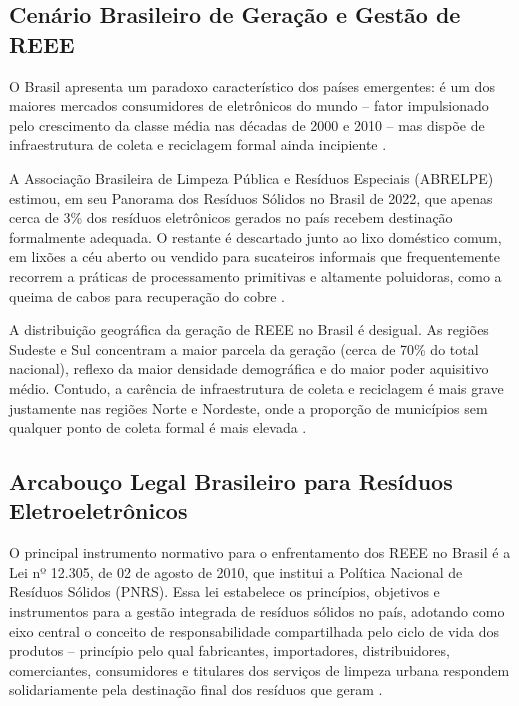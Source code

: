 \documentclass[12pt, a4paper]{article}
\numberwithin{equation}{section}
\numberwithin{figure}{section}
\numberwithin{table}{section}
\begin{document}
\subsection{Cenário Brasileiro de Geração e Gestão de REEE}

O Brasil apresenta um paradoxo característico dos países emergentes: é um dos
maiores mercados consumidores de eletrônicos do mundo -- fator impulsionado pelo
crescimento da classe média nas décadas de 2000 e 2010 -- mas dispõe de
infraestrutura de coleta e reciclagem formal ainda incipiente \cite{abrelpe2023}.

A Associação Brasileira de Limpeza Pública e Resíduos Especiais (ABRELPE)
estimou, em seu Panorama dos Resíduos Sólidos no Brasil de 2022, que apenas
cerca de 3\% dos resíduos eletrônicos gerados no país recebem destinação
formalmente adequada. O restante é descartado junto ao lixo doméstico comum,
em lixões a céu aberto ou vendido para sucateiros informais que frequentemente
recorrem a práticas de processamento primitivas e altamente poluidoras, como
a queima de cabos para recuperação do cobre \cite{abrelpe2023}.

A distribuição geográfica da geração de REEE no Brasil é desigual. As regiões
Sudeste e Sul concentram a maior parcela da geração (cerca de 70\% do total
nacional), reflexo da maior densidade demográfica e do maior poder aquisitivo
médio. Contudo, a carência de infraestrutura de coleta e reciclagem é mais
grave justamente nas regiões Norte e Nordeste, onde a proporção de municípios
sem qualquer ponto de coleta formal é mais elevada \cite{moreira2019}.

\subsection{Arcabouço Legal Brasileiro para Resíduos Eletroeletrônicos}

O principal instrumento normativo para o enfrentamento dos REEE no Brasil é
a Lei nº 12.305, de 02 de agosto de 2010, que institui a Política Nacional de
Resíduos Sólidos (PNRS). Essa lei estabelece os princípios, objetivos e
instrumentos para a gestão integrada de resíduos sólidos no país, adotando
como eixo central o conceito de responsabilidade compartilhada pelo ciclo de
vida dos produtos -- princípio pelo qual fabricantes, importadores,
distribuidores, comerciantes, consumidores e titulares dos serviços de limpeza
urbana respondem solidariamente pela destinação final dos resíduos que geram
\cite{brasil2010pnrs}.
\end{document}
